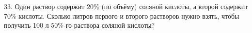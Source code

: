 33. Один раствор содержит $20\%$ (по объёму) соляной кислоты, а второй содержит $70\%$ кислоты. Сколько литров первого и второго растворов нужно взять, чтобы получить 100 л $50\%$-го раствора соляной кислоты?\\

